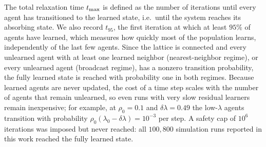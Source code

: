 \documentclass[a4paper,fleqn]{cas-sc}
\begin{document}
The total relaxation time $t_{\rm max}$ is defined as the number of iterations until every agent has transitioned to the learned state, i.e.\ until the system reaches its absorbing state.
We also record $t_{95}$, the first iteration at which at least $95\%$ of agents have learned, which measures how quickly most of the population learns, independently of the last few agents.
Since the lattice is connected and every unlearned agent with at least one learned neighbor (nearest-neighbor regime), or every unlearned agent (broadcast regime), has a nonzero transition probability, the fully learned state is reached with probability one in both regimes.
Because learned agents are never updated, the cost of a time step scales with the number of agents that remain unlearned, so even runs with very slow residual learners remain inexpensive; for example, at $\rho_0=0.1$ and $\delta\lambda=0.49$ the low-$\lambda$ agents transition with probability $\rho_0(\lambda_0-\delta\lambda)=10^{-3}$ per step.
A safety cap of $10^{6}$ iterations was imposed but never reached: all $100{,}800$ simulation runs reported in this work reached the fully learned state.
\end{document}
